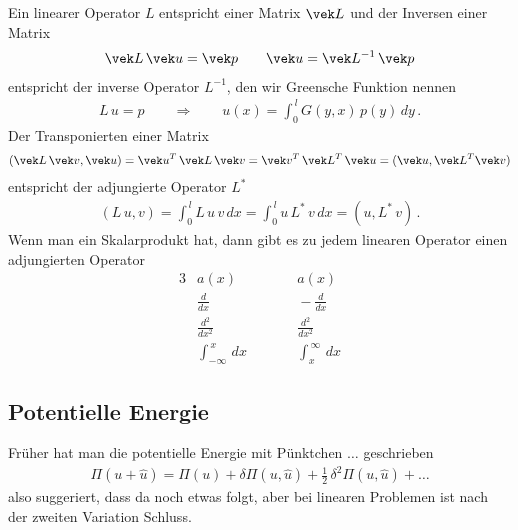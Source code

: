 Ein linearer Operator $L$ entspricht einer Matrix $\vek L$ und der Inversen einer Matrix
\begin{align}
\vek L\,\vek u = \vek p \qquad \vek  u = \vek L^{-1}\,\vek p
\end{align}
entspricht der inverse Operator $L^{-1}$, den wir Greensche Funktion nennen
\begin{align}
L\,u = p \qquad \Rightarrow \qquad u(x) = \int_0^{\,l} G(y,x)\,p(y)\,dy\,.
\end{align}
Der Transponierten einer Matrix
\begin{align}
(\vek L\,\vek v, \vek u ) = \vek u^T\,\vek L\,\vek v = \vek v^T\,\vek L^T\,\vek u = (\vek u, \vek L^T \vek v )
\end{align}
entspricht der adjungierte Operator $L^{*}$
\begin{align}
(L\,u,v) = \int_0^{\,l} L\,u\,v\,dx = \int_0^{\,l} u\,L^*\,v\,dx = (u,L^{*}\,v)\,.
\end{align}
Wenn man ein Skalarprodukt hat, dann gibt es zu jedem linearen Operator einen adjungierten Operator
\begin{alignat}{3}
&a(x)  &&\qquad a(x) \\
&\frac{d}{dx}  &&\qquad - \frac{d}{dx} \\
&\frac{d^2}{dx^2} &&\qquad \frac{d^2}{dx^2}\\
&\int_{-\infty}^{\,x} \,dx &&\qquad \int_{x}^{\,\infty} \,dx
\end{alignat}

\textcolor{blau2}{\section{Potentielle Energie}}
Fr\"{u}her hat man die potentielle Energie mit P\"{u}nktchen $\ldots$ geschrieben
\begin{align}
\Pi(u + \hat{u}) = \Pi(u) + \delta \Pi(u, \hat{u}) + \frac{1}{2}\,\delta^2 \Pi(u, \hat{u}) + \ldots
\end{align}
also suggeriert, dass da noch etwas folgt, aber bei linearen Problemen ist nach der zweiten Variation Schluss.


